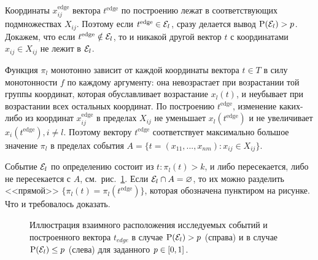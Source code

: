 Координаты $x_{ij}^\text{edge}$ вектора $t^\text{edge}$ по построению лежат в соответствующих подмножествах $X_{ij}$. Поэтому если $t^\text{edge} \in \mathcal{E}_l$, сразу делается вывод ${\mathrm{P}}(\mathcal{E}_l) > p$. Докажем, что если $t^\text{edge} \notin \mathcal{E}_l$, то и никакой другой вектор $t$ с координатами $x_{ij} \in X_{ij}$ не лежит в $\mathcal{E}_l$. 

Функция $\pi_l$ монотонно зависит от каждой координаты вектора $t \in T$ в силу монотонности $f$ по каждому аргументу: она невозрастает при возрастании той группы координат, которая обуславливает возрастание $x_l(t)$, и неубывает при возрастании всех остальных координат. По построению $t^\text{edge}$, изменение каких-либо из координат $x_{ij}^\text{edge}$ в пределах $X_{ij}$ не уменьшает $x_l(t^\text{edge})$ и не увеличивает $x_i(t^\text{edge}), i \neq l$. Поэтому вектору $t^\text{edge}$ соответствует максимально большое значение $\pi_l$ в пределах события $A = \{t = (x_{11}, ..., x_{nm}): x_{ij} \in X_{ij}\}$.

Событие $\mathcal{E}_l$ по определению состоит из $t: \pi_l(t) > k$, и либо пересекается, либо не пересекается с $A$, см.~рис.~\ref{ris:algo_sets}. Если $\mathcal{E}_l \cap A = \varnothing$, то их можно разделить <<прямой>> $\{\pi_l(t) = \pi_l(t^\text{edge})\}$, которая обозначена пунктиром на рисунке. Что и требовалось доказать.

\begin{figure}[h!]
\caption{\small Иллюстрация взаимного расположения исследуемых событий и построенного вектора $t_{edge}$ в случае ${\mathrm{P}}(\mathcal{E}_l) > p$ (справа) и в случае ${\mathrm{P}}(\mathcal{E}_l) \leq p$ (слева) для заданного $p \in [0,1]$.}
\label{ris:algo_sets}
\end{figure}


